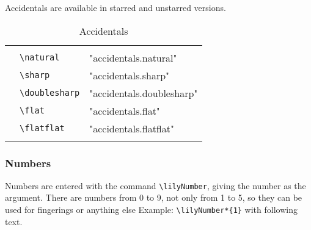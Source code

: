 \documentclass{article}
\newcommand*{\cmd}[1]{\texttt{\textbackslash #1}}
\newcommand{\tmpCaption}{} %
\newcommand{\tmpLabel}{}
\newenvironment{reftable}[2]
	{%
		\renewcommand{\tmpCaption}{#1}
		\renewcommand{\tmpLabel}{#2}
		\begin{table}[ht]
		\begin{center}
		\begin{tabular}[t]{lll}
		\hline
		&\\
	}
	{%
		&\\
		\hline
		\end{tabular}
		\caption{\tmpCaption}
		\label{table:\tmpLabel}
		\end{center}
		\end{table}
	}
\begin{document}
Accidentals are available in starred and unstarred versions.

\begin{reftable}{Accidentals}{accidentals}
\natural & \cmd{natural} & "accidentals.natural"\\
\sharp & \cmd{sharp} & "accidentals.sharp"\\
\doublesharp & \cmd{doublesharp} & "accidentals.doublesharp"\\
\flat & \cmd{flat} & "accidentals.flat"\\
\flatflat & \cmd{flatflat} & "accidentals.flatflat"\\
\end{reftable}

\subsubsection{Numbers}
Numbers are entered with the command \cmd{lilyNumber}, giving the number as the argument. There are numbers from 0 to 9, not only from 1 to 5, so they can be used for fingerings or anything else Example: \cmd{lilyNumber*\{1\}}  with following text.
\end{document}
